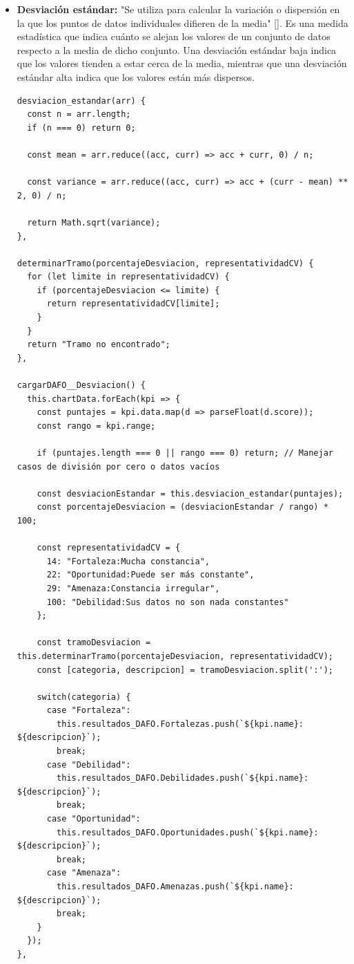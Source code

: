 \begin{itemize}
	\item \textbf{Desviación estándar:} "Se utiliza para calcular la variación o dispersión en la que los puntos de datos individuales difieren de la media" [\cite{def_desvest}]. Es una medida estadística que indica cuánto se alejan los valores de un conjunto de datos respecto a la media de dicho conjunto. Una desviación estándar baja indica que los valores tienden a estar cerca de la media, mientras que una desviación estándar alta indica que los valores están más dispersos.
	
\begin{lstlisting}[style=Javascript-color, caption={Función DAFO - Desviación estándar},label=Javascript-color_code_desvest]
desviacion_estandar(arr) {
  const n = arr.length;
  if (n === 0) return 0;

  const mean = arr.reduce((acc, curr) => acc + curr, 0) / n;

  const variance = arr.reduce((acc, curr) => acc + (curr - mean) ** 2, 0) / n;

  return Math.sqrt(variance);
},

determinarTramo(porcentajeDesviacion, representatividadCV) {
  for (let limite in representatividadCV) {
    if (porcentajeDesviacion <= limite) {
      return representatividadCV[limite];
    }
  }
  return "Tramo no encontrado";
},

cargarDAFO__Desviacion() {
  this.chartData.forEach(kpi => {
    const puntajes = kpi.data.map(d => parseFloat(d.score));
    const rango = kpi.range;
    
    if (puntajes.length === 0 || rango === 0) return; // Manejar casos de división por cero o datos vacíos

    const desviacionEstandar = this.desviacion_estandar(puntajes);
    const porcentajeDesviacion = (desviacionEstandar / rango) * 100;

    const representatividadCV = {
      14: "Fortaleza:Mucha constancia",
      22: "Oportunidad:Puede ser más constante",
      29: "Amenaza:Constancia irregular",
      100: "Debilidad:Sus datos no son nada constantes"
    };

    const tramoDesviacion = this.determinarTramo(porcentajeDesviacion, representatividadCV);
    const [categoria, descripcion] = tramoDesviacion.split(':');

    switch(categoria) {
      case "Fortaleza":
        this.resultados_DAFO.Fortalezas.push(`${kpi.name}: ${descripcion}`);
        break;
      case "Debilidad":
        this.resultados_DAFO.Debilidades.push(`${kpi.name}: ${descripcion}`);
        break;
      case "Oportunidad":
        this.resultados_DAFO.Oportunidades.push(`${kpi.name}: ${descripcion}`);
        break;
      case "Amenaza":
        this.resultados_DAFO.Amenazas.push(`${kpi.name}: ${descripcion}`);
        break;
    }
  });
},
\end{lstlisting}


\end{itemize}
